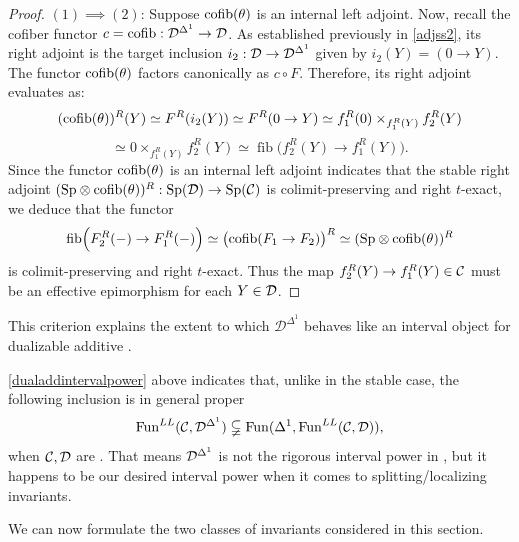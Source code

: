 \documentclass[a4paper,10pt, oneside]{amsart}
\begin{document}
\begin{proof}
	$(1) \implies (2)$: Suppose $\mathrm{cofib}(\theta)$ is an internal left adjoint. 	Now, recall the cofiber functor $c = \operatorname{cofib}: \mathcal{D}^{\Delta^1} \to \mathcal{D}$. As established previously in \cref{adjss2}, its right adjoint is the target inclusion $i_2: \mathcal{D} \to \mathcal{D}^{\Delta^1}$ given by $i_2(Y) = (0 \to Y)$. The functor $\mathrm{cofib}(\theta)$ factors canonically as $c \circ F$. Therefore, its right adjoint evaluates as:
	$$(\mathrm{cofib}(\theta))^R(Y)\simeq F^R(i_2(Y))\simeq F^R(0\to Y)\simeq f_1^R(0)\times_{f_1^R(Y)}f_2^R(Y)$$
	$$\simeq 0\times_{f_1^R(Y)}f_2^R(Y)\simeq\operatorname{fib}\bigl(f_2^R(Y)\to f_1^R(Y)\bigr).$$ Since the functor $\mathrm{cofib}(\theta)$ is an internal left adjoint indicates that the stable right adjoint $(\mathrm{Sp}\otimes\mathrm{cofib}(\theta))^R: \mathrm{Sp}(\mathcal{D})\to \mathrm{Sp}(\mathcal{C})$ is colimit-preserving and right $t$-exact, we deduce that
	the functor $$\operatorname{fib}\Bigl(F_2^R(-) \to F_1^R(-)\Bigr)\simeq \bigl(\mathrm{cofib}(F_1\to F_2)\bigr)^R\simeq (\mathrm{Sp}\otimes\mathrm{cofib}(\theta))^R$$ is colimit-preserving and right $t$-exact. Thus the map $f_2^R(Y) \to f_1^R(Y)\in\mathcal{C}$ must be an effective epimorphism for each $Y\in \mathcal{D}$.
\end{proof}
This criterion explains the extent to which \(\mathcal D^{\Delta^1}\) behaves like an interval object for dualizable additive \infcats.
\begin{rem}
	\cref{dualaddintervalpower} above indicates that, unlike in the stable case, the following inclusion is in general proper  $$\operatorname{Fun}^{LL}(\mathcal{C},\mathcal{D}^{\Delta^1})\subsetneqq \operatorname{Fun}(\Delta^1, \operatorname{Fun}^{LL}(\mathcal{C},\mathcal{D})),$$ when $\mathcal{C}, \mathcal{D}$ are \dualaddinfcats. That means $\mathcal{D}^{\Delta^1}$ is not the rigorous interval power in \praddbl, but it happens to be our desired interval power when it comes to splitting/localizing invariants.
\end{rem}
We can now formulate the two classes of invariants considered in this section.
\end{document}
